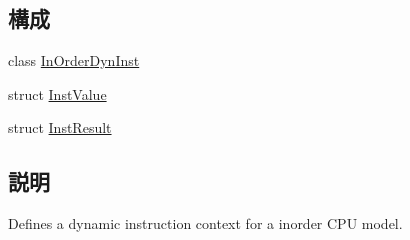 \subsection*{構成}
\begin{DoxyCompactItemize}
\item 
class \hyperlink{classInOrderDynInst}{InOrderDynInst}
\item 
struct \hyperlink{structInOrderDynInst_1_1InstValue}{InstValue}
\item 
struct \hyperlink{structInOrderDynInst_1_1InstResult}{InstResult}
\end{DoxyCompactItemize}


\subsection{説明}
Defines a dynamic instruction context for a inorder CPU model. 